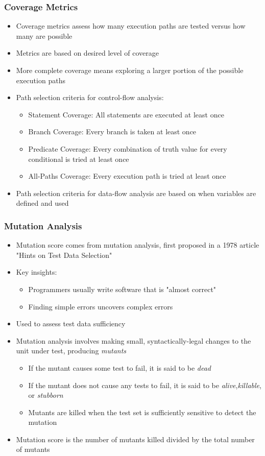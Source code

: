\documentclass{beamer}
\begin{document}
\begin{frame}
\frametitle{Coverage Metrics}
\begin{itemize}
	\item Coverage metrics assess how many execution paths are tested versus how many are possible
	\item Metrics are based on desired level of coverage \item More complete coverage means exploring a larger portion of the possible execution paths
	\item Path selection criteria for control-flow analysis:
	\begin{itemize}
		\item Statement Coverage: All statements are executed at least once
		\item Branch Coverage: Every branch is taken at least once
		\item Predicate Coverage: Every combination of truth value for every conditional is tried at least once
		\item All-Paths Coverage: Every execution path is tried at least once
	\end{itemize}
	\item Path selection criteria for data-flow analysis are based on when variables are defined and used
\end{itemize}
\end{frame}
\begin{frame}
\frametitle{Mutation Analysis}
\begin{itemize}
	\item Mutation score comes from mutation analysis, first proposed in a 1978 article "Hints on Test Data Selection"\cite{hintsOnTestData}
	\item Key insights:
	\begin{itemize}
		\item Programmers usually write software that is "almost correct"
		\item Finding simple errors uncovers complex errors
	\end{itemize}
	\item Used to assess test data sufficiency
	\item Mutation analysis involves making small, syntactically-legal changes to the unit under test, producing \textit{mutants}
	\begin{itemize}
		\item If the mutant causes some test to fail, it is said to be \textit{dead}
		\item If the mutant does not cause any tests to fail, it is said to be \textit{alive},\textit{killable}, or \textit{stubborn}
		\item Mutants are killed when the test set is sufficiently sensitive to detect the mutation
	\end{itemize}
	\item Mutation score is the number of mutants killed divided by the total number of mutants
\end{itemize}
\end{frame}
\end{document}

